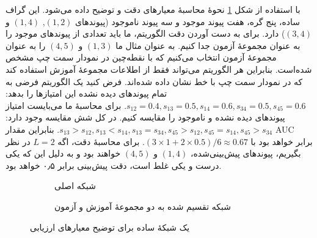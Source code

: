 با استفاده از شکل \ref{fig:1} نحوهٔ محاسبهٔ معیارهای دقت و  توضیح داده می‌شود. این گراف ساده، پنج گره، هفت پیوند موجود و سه پیوند ناموجود (پیوندهای $(1,2)$, $(1,4)$ و $(3,4)$) دارد. برای به دست آوردن دقت الگوریتم، ما باید تعدادی از پیوندهای موجود را به عنوان مجموعهٔ آزمون جدا کنیم. به عنوان مثال ما $(1,3)$ و $(4,5)$ را به عنوان مجموعهٔ آزمون انتخاب می‌کنیم که با نقطه‌چین در نمودار سمت چپ مشخص شده‌است. بنابراین هر الگوریتم می‌تواند فقط از اطلاعات مجموعهٔ آموزش استفاده کند که در نمودار سمت چپ با خط نشان داده شده‌اند. فرض کنید یک الگوریتم فرضی به تمام پیوندهای دیده نشده این امتیازها را بدهد: 
$s_{12}=0.4, s_{13}=0.5, s_{14}=0.6, s_{34}=0.5, s_{45}=0.6$.
برای محاسبهٔ  ما می‌بایست امتیاز پیوندهای دیده نشده و ناموجود را مقایسه کنیم. در کل شش مقایسه وجود دارد:
$s_{13} > s_{12}, s_{13} < s_{14}, s_{13} = s_{34}, s_{45} > s_{12}, s_{45} = s_{14}, s_{45} > s_{34}$.
بنابراین مقدار AUC برابر خواهد بود با
$(3 \times 1 + 2 \times 0.5) / 6 \approx 0.67$.
برای محاسبهٔ دقت، اگه $L=2$ در نظر بگیریم، پیوندهای پیش‌بینی‌شده، $(1,4)$ و $(4,5)$ خواهند بود و به دلیل این که یکی درست و یکی غلط است، دقت پیش‌بینی برابر ۰٫۵ خواهد بود.
\begin{figure}[!hbt]
  \begin{subfigure}{.5\textwidth}
    \centering
    \caption{شبکه اصلی}
  \end{subfigure}
  \begin{subfigure}{.5\textwidth}
    \centering
    \caption{شبکه تقسیم شده به دو مجموعهٔ آموزش و آزمون}
  \end{subfigure}
  \caption{یک شبکهٔ ساده برای توضیح معیارهای ارزیابی}
  \label{fig:1}
\end{figure}
